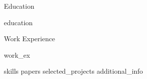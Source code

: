 \documentclass{resume}
\begin{document}


\begin{rSection}{\faGraduationCap \hspace{0.5mm} Education}

    {education}
    
\end{rSection}


\begin{rSection}{\faBriefcase \hspace{0.5mm} Work Experience}

    {work_ex}

\end{rSection}


{skills}
{papers}
{selected_projects}
{additional_info}





\end{document}
